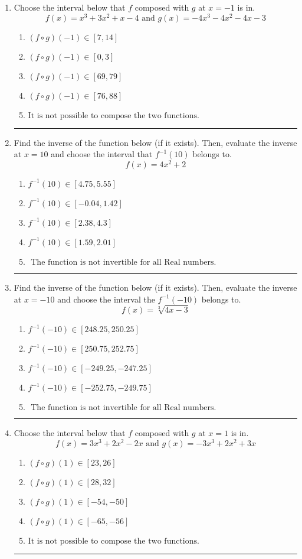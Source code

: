 \documentclass[14pt]{extbook}
\newcommand{\litem}[1]{\item#1\hspace*{-1cm}\rule{\textwidth}{0.4pt}}
\begin{document}
\begin{enumerate}
\litem{
Choose the interval below that $f$ composed with $g$ at $x=-1$ is in.\[ f(x) = x^{3} +3 x^{2} +x -4 \text{ and } g(x) = -4x^{3} -4 x^{2} -4 x -3 \]\begin{enumerate}[label=\Alph*.]
\item \( (f \circ g)(-1) \in [7, 14] \)
\item \( (f \circ g)(-1) \in [0, 3] \)
\item \( (f \circ g)(-1) \in [69, 79] \)
\item \( (f \circ g)(-1) \in [76, 88] \)
\item \( \text{It is not possible to compose the two functions.} \)

\end{enumerate} }
\litem{
Find the inverse of the function below (if it exists). Then, evaluate the inverse at $x = 10$ and choose the interval that $f^{-1}(10)$ belongs to.\[ f(x) = 4 x^2 + 2 \]\begin{enumerate}[label=\Alph*.]
\item \( f^{-1}(10) \in [4.75, 5.55] \)
\item \( f^{-1}(10) \in [-0.04, 1.42] \)
\item \( f^{-1}(10) \in [2.38, 4.3] \)
\item \( f^{-1}(10) \in [1.59, 2.01] \)
\item \( \text{ The function is not invertible for all Real numbers. } \)

\end{enumerate} }
\litem{
Find the inverse of the function below (if it exists). Then, evaluate the inverse at $x = -10$ and choose the interval the $f^{-1}(-10)$ belongs to.\[ f(x) = \sqrt[3]{4 x - 3} \]\begin{enumerate}[label=\Alph*.]
\item \( f^{-1}(-10) \in [248.25, 250.25] \)
\item \( f^{-1}(-10) \in [250.75, 252.75] \)
\item \( f^{-1}(-10) \in [-249.25, -247.25] \)
\item \( f^{-1}(-10) \in [-252.75, -249.75] \)
\item \( \text{ The function is not invertible for all Real numbers. } \)

\end{enumerate} }
\litem{
Choose the interval below that $f$ composed with $g$ at $x=1$ is in.\[ f(x) = 3x^{3} +2 x^{2} -2 x \text{ and } g(x) = -3x^{3} +2 x^{2} +3 x \]\begin{enumerate}[label=\Alph*.]
\item \( (f \circ g)(1) \in [23, 26] \)
\item \( (f \circ g)(1) \in [28, 32] \)
\item \( (f \circ g)(1) \in [-54, -50] \)
\item \( (f \circ g)(1) \in [-65, -56] \)
\item \( \text{It is not possible to compose the two functions.} \)


\end{enumerate}}
\end{enumerate}
\end{document}
